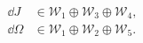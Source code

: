 \begin{equation}
\begin{aligned}
   \dd J &\in \mathcal{W}_1 \oplus \mathcal{W}_3 
      \oplus \mathcal{W}_4 , \\
   \dd \Omega &\in \mathcal{W}_1 \oplus \mathcal{W}_2 
      \oplus \mathcal{W}_5 .
\end{aligned}
\end{equation}

